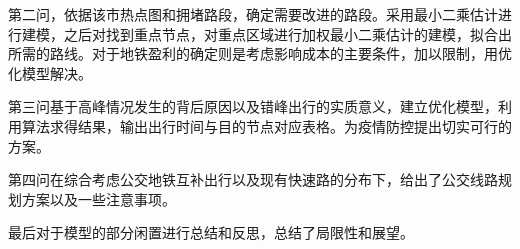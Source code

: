     {\song\xiaosihao
{}



\setlength{\parindent}{2em}第二问，依据该市热点图和拥堵路段，确定需要改进的路段。采用最小二乘估计进行建模，之后对找到重点节点，对重点区域进行加权最小二乘估计的建模，拟合出所需的路线。对于地铁盈利的确定则是考虑影响成本的主要条件，加以限制，用优化模型解决。

\setlength{\parindent}{2em}第三问基于高峰情况发生的背后原因以及错峰出行的实质意义，建立优化模型，利用算法求得结果，输出出行时间与目的节点对应表格。为疫情防控提出切实可行的方案。

\setlength{\parindent}{2em}第四问在综合考虑公交地铁互补出行以及现有快速路的分布下，给出了公交线路规划方案以及一些注意事项。

\setlength{\parindent}{2em}最后对于模型的部分闲置进行总结和反思，总结了局限性和展望。
}
